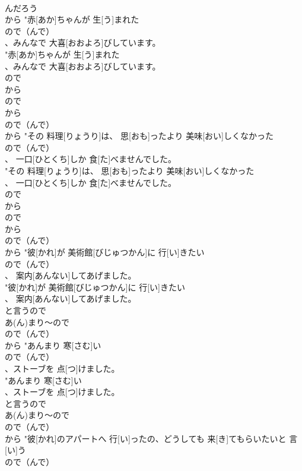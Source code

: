 \documentclass[8pt]{extreport}
\begin{document}
\begin{CJK}{UTF8}{min}
\\	んだろう
\\	から	"赤[あか]ちゃんが 生[う]まれた
\\	ので（んで）
\\	、みんなで 大喜[おおよろ]びしています。
\\	"赤[あか]ちゃんが 生[う]まれた
\\	、みんなで 大喜[おおよろ]びしています。
\\	ので 
\\	から 
\\	ので 
\\	から 
\\	ので（んで）
\\	から	"その 料理[りょうり]は、 思[おも]ったより 美味[おい]しくなかった
\\	ので（んで）
\\	、 一口[ひとくち]しか 食[た]べませんでした。
\\	"その 料理[りょうり]は、 思[おも]ったより 美味[おい]しくなかった
\\	、 一口[ひとくち]しか 食[た]べませんでした。
\\	ので 
\\	から 
\\	ので 
\\	から 
\\	ので（んで）
\\	から	"彼[かれ]が 美術館[びじゅつかん]に 行[い]きたい
\\	ので（んで）
\\	、 案内[あんない]してあげました。
\\	"彼[かれ]が 美術館[びじゅつかん]に 行[い]きたい
\\	、 案内[あんない]してあげました。
\\	と言うので 
\\	あ(ん)まり～ので	
\\	ので（んで）
\\	から	"あんまり 寒[さむ]い
\\	ので（んで）
\\	、ストーブを 点[つ]けました。
\\	"あんまり 寒[さむ]い
\\	、ストーブを 点[つ]けました。
\\	と言うので 
\\	あ(ん)まり～ので	
\\	ので（んで）
\\	から	"彼[かれ]のアパートへ 行[い]ったの、どうしても 来[き]てもらいたいと 言[い]う
\\	ので（んで）

\end{CJK}
\end{document}
